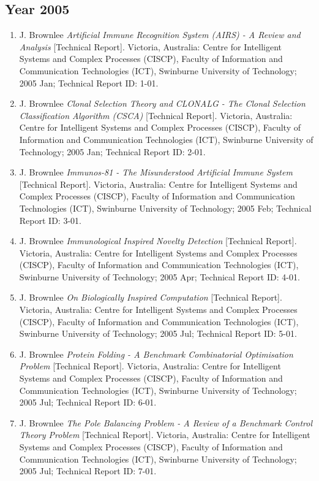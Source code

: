 %
%
\subsection{Year 2005}

\begin{enumerate}
	\small
	\item J. Brownlee \emph{Artificial Immune Recognition System (AIRS) - A Review and Analysis} [Technical Report]. Victoria, Australia: Centre for Intelligent Systems and Complex Processes (CISCP), Faculty of Information and Communication Technologies (ICT), Swinburne University of Technology; 2005 Jan; Technical Report ID: 1-01.
	\item J. Brownlee \emph{Clonal Selection Theory and CLONALG - The Clonal Selection Classification Algorithm (CSCA)} [Technical Report]. Victoria, Australia: Centre for Intelligent Systems and Complex Processes (CISCP), Faculty of Information and Communication Technologies (ICT), Swinburne University of Technology; 2005 Jan; Technical Report ID: 2-01.
	\item J. Brownlee \emph{Immunos-81 - The Misunderstood Artificial Immune System} [Technical Report]. Victoria, Australia: Centre for Intelligent Systems and Complex Processes (CISCP), Faculty of Information and Communication Technologies (ICT), Swinburne University of Technology; 2005 Feb; Technical Report ID: 3-01.
	\item J. Brownlee \emph{Immunological Inspired Novelty Detection} [Technical Report]. Victoria, Australia: Centre for Intelligent Systems and Complex Processes (CISCP), Faculty of Information and Communication Technologies (ICT), Swinburne University of Technology; 2005 Apr; Technical Report ID: 4-01.
	\item J. Brownlee \emph{On Biologically Inspired Computation} [Technical Report]. Victoria, Australia: Centre for Intelligent Systems and Complex Processes (CISCP), Faculty of Information and Communication Technologies (ICT), Swinburne University of Technology; 2005 Jul; Technical Report ID: 5-01.
	\item J. Brownlee \emph{Protein Folding - A Benchmark Combinatorial Optimisation Problem} [Technical Report]. Victoria, Australia: Centre for Intelligent Systems and Complex Processes (CISCP), Faculty of Information and Communication Technologies (ICT), Swinburne University of Technology; 2005 Jul; Technical Report ID: 6-01.
	\item J. Brownlee \emph{The Pole Balancing Problem - A Review of a Benchmark Control Theory Problem} [Technical Report]. Victoria, Australia: Centre for Intelligent Systems and Complex Processes (CISCP), Faculty of Information and Communication Technologies (ICT), Swinburne University of Technology; 2005 Jul; Technical Report ID: 7-01.

\end{enumerate}
